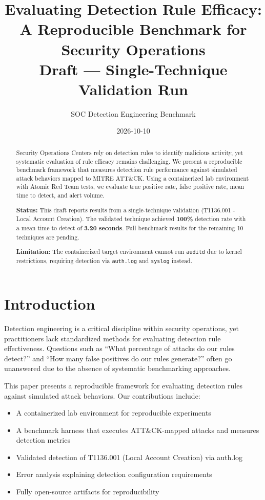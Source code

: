\documentclass[11pt,a4paper]{article}
\title{Evaluating Detection Rule Efficacy: A Reproducible Benchmark for Security Operations\\
\large{Draft --- Single-Technique Validation Run}}
\author{SOC Detection Engineering Benchmark}
\date{2026-10-10}
\begin{document}
\maketitle

\begin{abstract}
Security Operations Centers rely on detection rules to identify malicious activity, yet systematic evaluation of rule efficacy remains challenging. We present a reproducible benchmark framework that measures detection rule performance against simulated attack behaviors mapped to MITRE ATT\&CK. Using a containerized lab environment with Atomic Red Team tests, we evaluate true positive rate, false positive rate, mean time to detect, and alert volume.

\textbf{Status:} This draft reports results from a single-technique validation (T1136.001 - Local Account Creation). The validated technique achieved \textbf{100\%} detection rate with a mean time to detect of \textbf{3.20 seconds}. Full benchmark results for the remaining 10 techniques are pending.

\textbf{Limitation:} The containerized target environment cannot run \texttt{auditd} due to kernel restrictions, requiring detection via \texttt{auth.log} and \texttt{syslog} instead.
\end{abstract}

\section{Introduction}

Detection engineering is a critical discipline within security operations, yet practitioners lack standardized methods for evaluating detection rule effectiveness. Questions such as ``What percentage of attacks do our rules detect?'' and ``How many false positives do our rules generate?'' often go unanswered due to the absence of systematic benchmarking approaches.

This paper presents a reproducible framework for evaluating detection rules against simulated attack behaviors. Our contributions include:

\begin{itemize}
    \item A containerized lab environment for reproducible experiments
    \item A benchmark harness that executes ATT\&CK-mapped attacks and measures detection metrics
    \item Validated detection of T1136.001 (Local Account Creation) via auth.log
    \item Error analysis explaining detection configuration requirements
    \item Fully open-source artifacts for reproducibility
\end{itemize}
\end{document}
